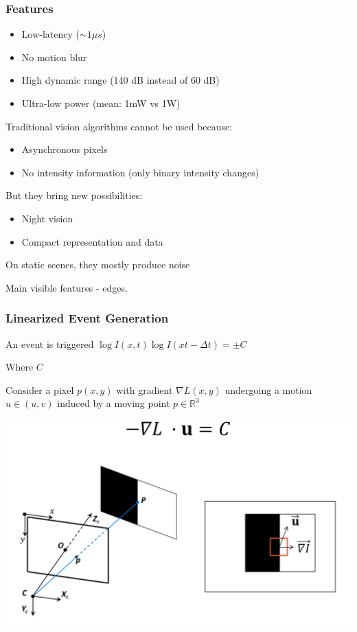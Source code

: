 \subsubsection{Features}

\begin{itemize}
\item Low-latency ($\sim1 \mu s$)
\item No motion blur
\item High dynamic range (140 dB instead of 60 dB)
\item Ultra-low power (mean: 1mW vs 1W)
\end{itemize}

Traditional vision algorithms cannot be used because:
\begin{itemize}
\item Asynchronous pixels
\item No intensity information (only binary intensity changes)
\end{itemize}

But they bring new possibilities:
\begin{itemize}
\item Night vision
\item Compact representation and data
\end{itemize}

On static scenes, they mostly produce noise

Main visible features - edges. 

\subsubsection{Linearized Event Generation}

An event is triggered $\log I(x,t) \log I(xt-\Delta t)=\pm C$

Where $C$ 

Consider a pixel $p(x,y)$ with gradient $\nabla L(x,y)$ undergoing a motion $u\in(u,v)$ induced by a moving point $p \in\mathbb{R}^3 $

\includegraphics[width=0.9\columnwidth]{event_cameras_fig/event_cameras.png}

